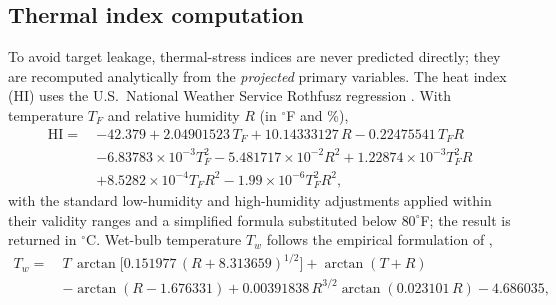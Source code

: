 \documentclass[review,11pt]{elsarticle}
\newcommand{\degC}{\ensuremath{^{\circ}\mathrm{C}}}
\begin{document}
\subsection{Thermal index computation}\label{sec:indices}
To avoid target leakage, thermal-stress indices are never predicted directly;
they are recomputed analytically from the \emph{projected} primary variables.
The heat index (HI) uses the U.S.\ National Weather Service Rothfusz regression
\citep{rothfusz1990}. With temperature $T_F$ and relative humidity $R$ (in
$^{\circ}$F and \%),
\begin{align}
\mathrm{HI} =\ & -42.379 + 2.04901523\,T_F + 10.14333127\,R
     - 0.22475541\,T_F R \nonumber\\
   & - 6.83783\!\times\!10^{-3} T_F^{2}
     - 5.481717\!\times\!10^{-2} R^{2}
     + 1.22874\!\times\!10^{-3} T_F^{2} R \nonumber\\
   & + 8.5282\!\times\!10^{-4} T_F R^{2}
     - 1.99\!\times\!10^{-6} T_F^{2} R^{2},
\label{eq:hi}
\end{align}
with the standard low-humidity and high-humidity adjustments applied within
their validity ranges and a simplified formula substituted below $80^{\circ}$F;
the result is returned in $\degC$. Wet-bulb temperature $T_w$ follows the
empirical formulation of \citet{stull2011},
\begin{align}
T_w =\ & T\,\arctan\!\big[0.151977\,(R+8.313659)^{1/2}\big]
       + \arctan(T+R) \nonumber\\
     & - \arctan(R-1.676331)
       + 0.00391838\,R^{3/2}\arctan(0.023101\,R) - 4.686035,
\label{eq:wetbulb}
\end{align}
\end{document}
